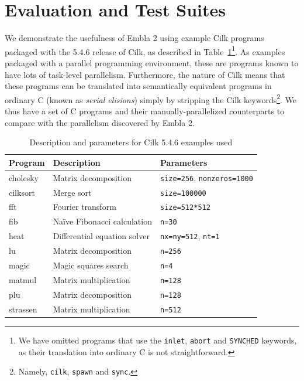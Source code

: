 \section{Evaluation and Test Suites} \label{sresults}

We demonstrate the usefulness of Embla 2 using example Cilk programs packaged with the 5.4.6 release of Cilk,
as described in Table~\ref{cilk-ex}\footnote{We
have omitted programs that use the \texttt{inlet}, \texttt{abort} and \texttt{SYNCHED} keywords,
as their translation into ordinary C is not straightforward.}.
As examples packaged with a parallel programming environment,
these are programs known to have lots of task-level parallelism.
Furthermore, the nature of Cilk means that these programs can be translated into semantically equivalent programs in ordinary C (known as \emph{serial elisions}) simply by stripping the Cilk keywords\footnote{Namely,
\texttt{cilk}, \texttt{spawn} and \texttt{sync}.}.
We thus have a set of C programs and their manually-parallelized counterparts to compare with the parallelism discovered by Embla 2.

\begin{table}[t]
\centering
\scriptsize
\begin{tabular}{ | l | l | l | }
\hline
Program & Description & Parameters \\
\hline
\textsf{cholesky} & Matrix decomposition & \texttt{size=256}, \texttt{nonzeros=1000} \\
\textsf{cilksort} & Merge sort & \texttt{size=100000} \\
\textsf{fft} & Fourier transform & \texttt{size=512*512} \\
\textsf{fib} & Na\"ive Fibonacci calculation & \texttt{n=30} \\
\textsf{heat} & Differential equation solver & \texttt{nx=ny=512}, \texttt{nt=1} \\ 
\textsf{lu} & Matrix decomposition & \texttt{n=256} \\
\textsf{magic} & Magic squares search & \texttt{n=4} \\
\textsf{matmul} & Matrix multiplication & \texttt{n=128} \\
\textsf{plu} & Matrix decomposition & \texttt{n=128} \\
\textsf{strassen} & Matrix multiplication & \texttt{n=512} \\
\hline
\end{tabular}
\normalsize
\caption{Description and parameters for Cilk 5.4.6 examples used}
\label{cilk-ex}
\end{table}

